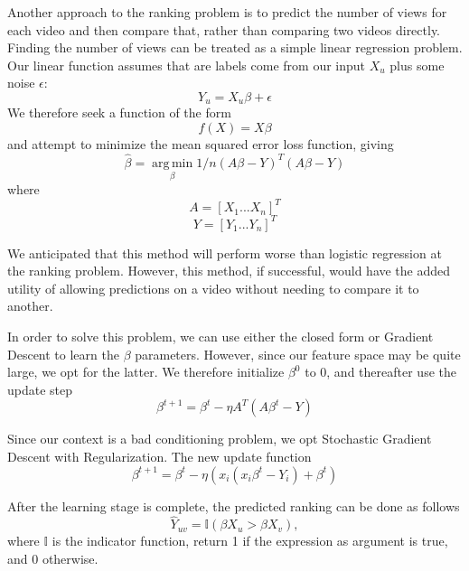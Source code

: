 Another approach to the ranking problem is to predict the number of views for each video and then compare that, rather than comparing two videos directly. Finding the number of views can be treated as a simple linear regression problem. Our linear function assumes that are labels come from our input $X_u$ plus some noise $\epsilon$:
\begin{equation}
Y_u = X_u \beta + \epsilon
\end{equation}
We therefore seek a function of the form
\begin{equation}
f(X) = X \beta
\end{equation}
and attempt to minimize the mean squared error loss function, giving
\begin{equation}
	\hat{\beta} = \operatorname*{arg\,min}_{\textbf{$\beta$}} 1/n (A \beta - Y)^T(A \beta - Y)
\end{equation}
where
\begin{equation}
	A = [X_1 ... X_n]^T
\end{equation}
\begin{equation}
	Y = [Y_1 ... Y_n]^T
\end{equation}

We anticipated that this method will perform worse than logistic regression at the ranking problem.  However, this method, if successful, would have the added utility of allowing predictions on a video without needing to compare it to another.
  
In order to solve this problem, we can use either the closed form or Gradient Descent to learn the $\beta$ parameters.  However, since our feature space may be quite large, we opt for the latter.  We therefore initialize $\beta^0$ to 0, and thereafter use the update step
\begin{equation}
\beta^{t+1} = \beta^t - \eta A^T (A \beta^t - Y)
\end{equation}
 
Since our context is a bad conditioning problem, we opt Stochastic Gradient Descent with Regularization. The new update function
	\begin{equation}
		\beta^{t+1} = \beta^t - \eta (x_i (x_i\beta^t - Y_i) + \beta^t)
	\end{equation}

After the learning stage is complete, the predicted ranking can be done as follows
\begin{equation}
\hat{Y}_{uv} = \mathbb{I}(\beta X_u > \beta X_v),
\end{equation}
where $\mathbb{I}$ is the indicator function, return 1 if the expression as argument is true, and 0 otherwise.

